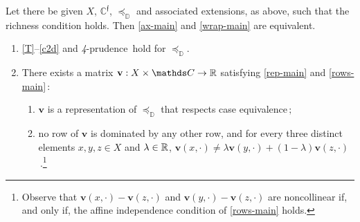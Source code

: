 \documentclass[12pt,a4paper,twoside]{article}
\newcommand{\novel}{\mathfrak f}
\newcommand{\preceqb}{\mathbin{\preceq}}
\newcommand{\mbbd}{{\mathds D}}
\newcommand{\mbbc}{{\mathds C}}
\newcommand{\mbbcp}{{\mathds C^{\novel}}}
\newcommand{\fourpru}{\textit{4}-\textup{prudence}}
\begin{document}
\begin{theorem}\label{thm-main}
  Let there be given $X$, $\mbbcp$, $\preceqb_ \mbbd$ and
  associated extensions, as above, such that the richness condition holds. Then
  \ref{ax-main} and \ref{wrap-main} are equivalent.

\begin{enumerate}[label=\textup{(\ref{thm-main}.\roman*)}]

\item\label{ax-main}

  \ref{T}--\ref{c2d} and \fourpru\ hold for $\preceq_{\mbbd}$.
  
\item\label{wrap-main} There exists a matrix
  $ \mathbf{v} : X \times \mbbc \rightarrow \R $ satisfying \ref{rep-main} and \ref{rows-main}$\,:$
  \begin{enumerate}[label=\textup{(\ref{thm-main}.\alph*)}]
  \item\label{rep-main} $ \mathbf{v} $ is a representation of
    $ \preceq _ { \mbbd }$ that respects case equivalence$\,;$

  \item\label{rows-main} no row of $\mathbf{v}$ is dominated by
    any other row, and for every three distinct elements $x,y, z \in X$ and
    $\lambda \in \mathbb R$, $\mathbf{v} (x, \cdot) \neq \lambda
    \mathbf{v}(y,\cdot) + (1-\lambda) \mathbf{v}(z,\cdot)$\,.\footnote{Observe that
$\mathbf{v}(x,\cdot)- \mathbf{v}(z,\cdot)$ and
$\mathbf{v}(y,\cdot)-\mathbf{v}(z,\cdot)$ are noncollinear if, and only if,
the affine independence condition of \ref{rows-main} holds.}

\end{enumerate}

\end{enumerate}                 %
\end{theorem}
\end{document}
